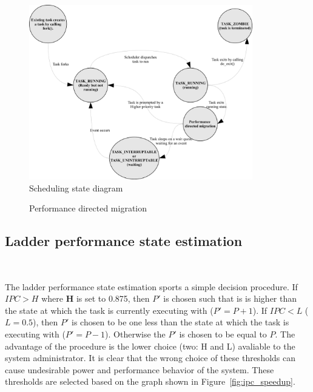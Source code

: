 \begin{figure}[h!]
  \begin{center}
    \includegraphics[height=3in]{figures/Mod_Linux_Sched.jpg}%
    \caption{Scheduling state diagram}
    \label{fig:pds_method}
  \end{center}
\end{figure}

\begin{figure}[h!]
  \begin{center}
    \caption{Performance directed migration}
    \label{fig:pds_migration}
  \end{center}
\end{figure}


\subsection{Ladder performance state estimation}~\label{sec:ladder}

The ladder performance state estimation sports a simple decision procedure. If $IPC > H$ 
where \textbf{H} is set to 0.875, then $P'$ is chosen such that is is higher than the state
at which the task is currently executing with ($P' = P + 1$). If $IPC < L$ ($L = 0.5$), then 
$P'$ is chosen to be one less than the state at which the task is executing with ($P' = P - 1$). 
Otherwise the $P'$ is chosen to be equal to $P$. The advantage of the procedure is the lower
choice (two: H and L) avaliable to the system administrator. It is clear that the wrong choice of these
thresholds can cause undesirable power and performance behavior of the system. These thresholds are
selected based on the graph shown in Figure~\ref{fig:ipc_speedup}. 


